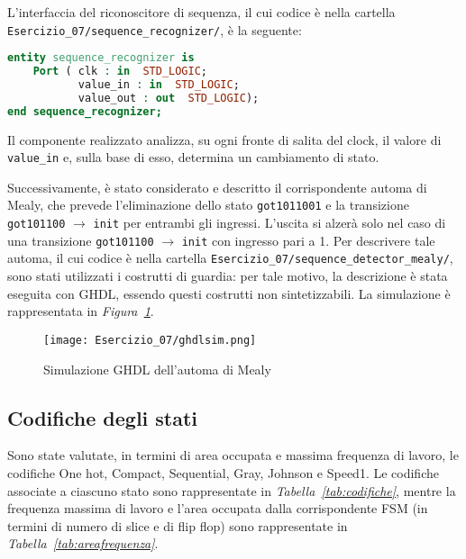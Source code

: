 L'interfaccia del riconoscitore di sequenza, il cui codice è nella cartella \lstinline{Esercizio_07/sequence_recognizer/}, è la seguente:

\begin{lstlisting}[language=VHDL,caption={Interfaccia del riconoscitore di sequenza}] 
entity sequence_recognizer is
    Port ( clk : in  STD_LOGIC;
           value_in : in  STD_LOGIC;
           value_out : out  STD_LOGIC);
end sequence_recognizer;
\end{lstlisting}%

Il componente realizzato analizza, su ogni fronte di salita del clock, il valore di \lstinline{value_in} e, sulla base di esso, determina un cambiamento di stato.

Successivamente, è stato considerato e descritto il corrispondente automa di Mealy, che prevede l'eliminazione dello stato \lstinline{got1011001} e la transizione \lstinline{got101100} $\rightarrow$ \lstinline{init} per entrambi gli ingressi. L'uscita si alzerà solo nel caso di una transizione \lstinline{got101100} $\rightarrow$ \lstinline{init} con ingresso pari a 1. Per descrivere tale automa, il cui codice è nella cartella \lstinline{Esercizio_07/sequence_detector_mealy/}, sono stati utilizzati i costrutti di guardia: per tale motivo, la descrizione è stata eseguita con GHDL, essendo questi costrutti non sintetizzabili. La simulazione è rappresentata in \textit{Figura~\ref{fig:ghdl}}.

\begin{figure}[h]
\begin{centering}
\texttt{[image: Esercizio\_07/ghdlsim.png]}
\par\end{centering}
\caption{\label{fig:ghdl}Simulazione GHDL dell'automa di Mealy}
\end{figure}

\subsection{Codifiche degli stati}
Sono state valutate, in termini di area occupata e massima frequenza di lavoro, le codifiche One hot, Compact, Sequential, Gray, Johnson e Speed1. Le codifiche associate a ciascuno stato sono rappresentate in \textit{Tabella~\ref{tab:codifiche}}, mentre la frequenza massima di lavoro e l'area occupata dalla corrispondente FSM (in termini di numero di slice e di flip flop) sono rappresentate in \textit{Tabella~\ref{tab:areafrequenza}}.

